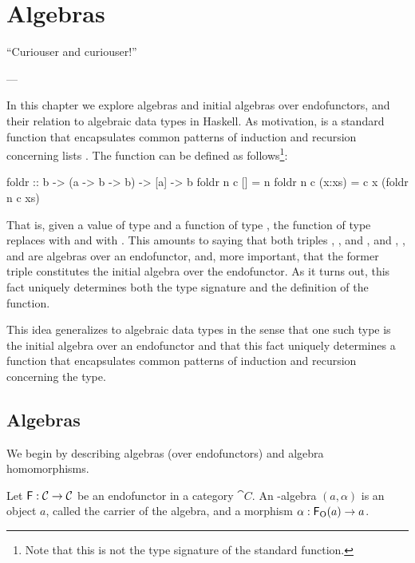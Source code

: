 \chapter{Algebras}
\label{chap:algebras}

\epigraph{
  ``Curiouser and curiouser!''
}{---\textcite[23]{carroll-2004}}

In this chapter we explore algebras and initial algebras over
endofunctors, and their relation to algebraic data types in Haskell.
As motivation,  is a standard function that
encapsulates common patterns of induction and recursion concerning
lists \parencite[355--356]{hutton-1999}. The 
function can be defined as follows\footnote{Note that this is not the
  type signature of the standard  function.}:
\begin{codehaskell}
foldr :: b -> (a -> b -> b) -> [a] -> b
foldr n c []     = n
foldr n c (x:xs) = c x (foldr n c xs)
\end{codehaskell}
That is, given a value  of type  and a
function  of type , the
function  of type 
replaces \texthaskell{[]} with  and \texthaskell{(:)}
with . This amounts to saying that both triples
\texthaskell{[a]}, \texthaskell{[]}, and \texthaskell{(:)}, and
, , and  are algebras
over an endofunctor, and, more important, that the former triple
constitutes the initial algebra over the endofunctor. As it turns out,
this fact uniquely determines both the type signature and the
definition of the  function.

This idea generalizes to algebraic data types in the sense that one
such type is the initial algebra over an endofunctor and that this
fact uniquely determines a function that encapsulates common patterns
of induction and recursion concerning the type.

\section{Algebras}
\label{sec:algebras}

We begin by describing algebras (over endofunctors) and algebra
homomorphisms.

\begin{definition}
  \label{def:algebra}


  Let $\mathsf{F}: \mathcal{C} \to \mathcal{C}$ be an endofunctor in a category
  $\cat{C}$. An -algebra $(a,\alpha)$ is an object $a$, called
  the carrier of the algebra, and a morphism $\alpha: \mathsf{F}_{\operatorname{O}}(a) \to
  a$.

\end{definition}

